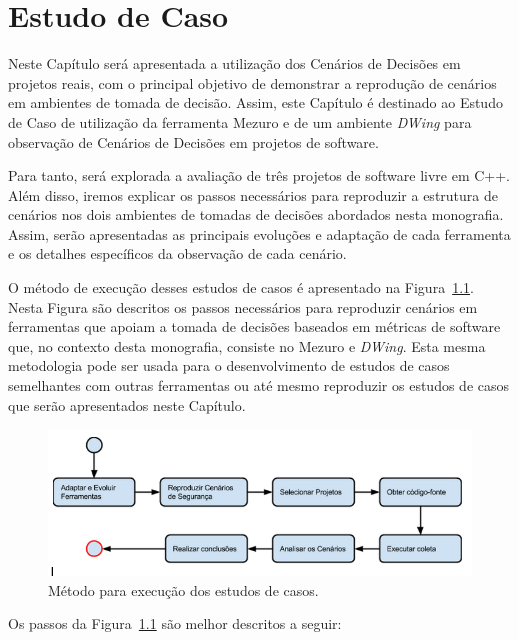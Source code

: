 \chapter{Estudo de Caso}
\label{cap-case-study}

%

Neste Capítulo será apresentada a utilização dos Cenários de Decisões em projetos reais, com o principal objetivo de demonstrar a reprodução de cenários em ambientes de tomada de decisão. Assim, este Capítulo é destinado ao Estudo de Caso de utilização da ferramenta Mezuro e de um ambiente \emph{DWing} para observação de Cenários de Decisões em projetos de software.

Para tanto, será explorada a avaliação de três projetos de software livre em C++. Além disso, iremos explicar os passos necessários para reproduzir a estrutura de cenários nos dois ambientes de tomadas de decisões abordados nesta monografia. Assim, serão apresentadas as principais evoluções e adaptação de cada ferramenta e os detalhes específicos da observação de cada cenário.

O método de execução desses estudos de casos é apresentado na Figura~\ref{method}. Nesta Figura são descritos os passos necessários para reproduzir cenários em ferramentas que apoiam a tomada de decisões baseados em métricas de software que, no contexto desta monografia, consiste no Mezuro e \emph{DWing}. Esta mesma metodologia pode ser usada para o desenvolvimento de estudos de casos semelhantes com outras ferramentas ou até mesmo reproduzir os estudos de casos que serão apresentados neste Capítulo.

\graphicspath{{figuras/}}
\begin{figure}[h]
\centering
\includegraphics[width=1.0\textwidth]{fluxograma}
\caption{Método para execução dos estudos de casos.}
\label{method}
\end{figure}

Os passos da Figura~\ref{method} são melhor descritos a seguir:

